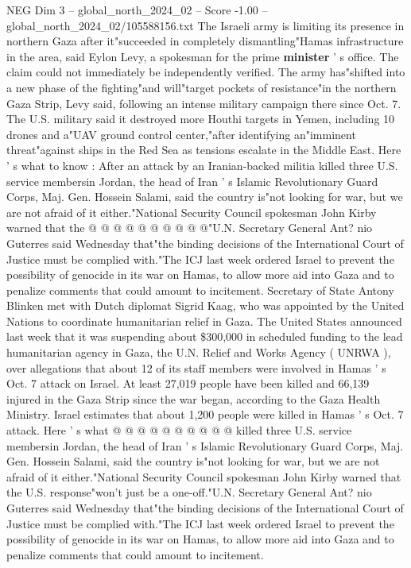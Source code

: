 \begin{textsample}{NEG Dim 3 – global\_north\_2024\_02 – Score -1.00 – global\_north\_2024\_02/105588156.txt}  \label{ex:f3_neg_205}
The Israeli army is limiting its presence in northern Gaza after it"succeeded in completely dismantling"Hamas infrastructure in the area, said Eylon Levy, a spokesman for the prime \textbf{minister} ' s office.
The claim could not immediately be independently verified.
The army has"shifted into a new phase of the fighting"and will"target pockets of resistance"in the northern Gaza Strip, Levy said, following an intense military campaign there since Oct. 7.
The U.S. military said it destroyed more Houthi targets in Yemen, including 10 drones and a"UAV ground control center,"after identifying an"imminent threat"against ships in the Red Sea as tensions escalate in the Middle East.
Here ' s what to know : After an attack by an Iranian-backed militia killed three U.S. service membersin Jordan, the head of Iran ' s Islamic Revolutionary Guard Corps, Maj.
Gen.
Hossein Salami, said the country is"not looking for war, but we are not afraid of it either."National Security Council spokesman John Kirby warned that the @ @ @ @ @ @ @ @ @ @"U.N.
Secretary General Ant? nio Guterres said Wednesday that"the binding decisions of the International Court of Justice must be complied with."The ICJ last week ordered Israel to prevent the possibility of genocide in its war on Hamas, to allow more aid into Gaza and to penalize comments that could amount to incitement.
Secretary of State Antony Blinken met with Dutch diplomat Sigrid Kaag, who was appointed by the United Nations to coordinate humanitarian relief in Gaza.
The United States announced last week that it was suspending about \$300,000 in scheduled funding to the lead humanitarian agency in Gaza, the U.N.
Relief and Works Agency ( UNRWA ), over allegations that about 12 of its staff members were involved in Hamas ' s Oct. 7 attack on Israel.
At least 27,019 people have been killed and 66,139 injured in the Gaza Strip since the war began, according to the Gaza Health Ministry.
Israel estimates that about 1,200 people were killed in Hamas ' s Oct. 7 attack.
Here ' s what @ @ @ @ @ @ @ @ @ @ killed three U.S. service membersin Jordan, the head of Iran ' s Islamic Revolutionary Guard Corps, Maj.
Gen.
Hossein Salami, said the country is"not looking for war, but we are not afraid of it either."National Security Council spokesman John Kirby warned that the U.S. response"won't just be a one-off."U.N.
Secretary General Ant? nio Guterres said Wednesday that"the binding decisions of the International Court of Justice must be complied with."The ICJ last week ordered Israel to prevent the possibility of genocide in its war on Hamas, to allow more aid into Gaza and to penalize comments that could amount to incitement.

\end{textsample}
